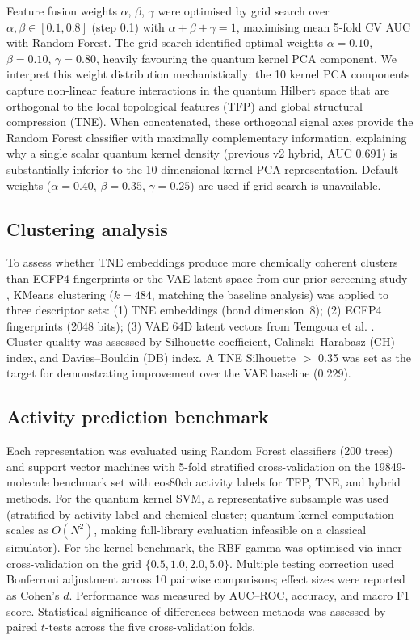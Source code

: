 \documentclass[11pt,a4paper]{article}
\begin{document}
Feature fusion weights $\alpha$, $\beta$, $\gamma$ were optimised by grid search over $\alpha, \beta \in [0.1, 0.8]$ (step 0.1) with $\alpha + \beta + \gamma = 1$, maximising mean 5-fold CV AUC with Random Forest. The grid search identified optimal weights $\alpha = 0.10$, $\beta = 0.10$, $\gamma = 0.80$, heavily favouring the quantum kernel PCA component. We interpret this weight distribution mechanistically: the 10 kernel PCA components capture non-linear feature interactions in the quantum Hilbert space that are orthogonal to the local topological features (TFP) and global structural compression (TNE). When concatenated, these orthogonal signal axes provide the Random Forest classifier with maximally complementary information, explaining why a single scalar quantum kernel density (previous v2 hybrid, AUC \num{0.691}) is substantially inferior to the 10-dimensional kernel PCA representation. Default weights ($\alpha = 0.40$, $\beta = 0.35$, $\gamma = 0.25$) are used if grid search is unavailable.

\subsection{Clustering analysis}

To assess whether TNE embeddings produce more chemically coherent clusters than ECFP4 fingerprints or the VAE latent space from our prior screening study \citep{temgoua2026antimalarial}, KMeans clustering ($k = 484$, matching the baseline analysis) was applied to three descriptor sets: (1) TNE embeddings (bond dimension~8); (2) ECFP4 fingerprints (\num{2048} bits); (3) VAE 64D latent vectors from Temgoua et al. \citep{temgoua2026antimalarial}. Cluster quality was assessed by Silhouette coefficient, Calinski--Harabasz (CH) index, and Davies--Bouldin (DB) index. A TNE Silhouette $>$ 0.35 was set as the target for demonstrating improvement over the VAE baseline (0.229).

\subsection{Activity prediction benchmark}

Each representation was evaluated using Random Forest classifiers (200 trees) and support vector machines with 5-fold stratified cross-validation on the \num{19849}-molecule benchmark set with eos80ch activity labels for TFP, TNE, and hybrid methods. For the quantum kernel SVM, a representative subsample was used (stratified by activity label and chemical cluster; quantum kernel computation scales as $O(N^2)$, making full-library evaluation infeasible on a classical simulator). For the kernel benchmark, the RBF gamma was optimised via inner cross-validation on the grid $\{0.5, 1.0, 2.0, 5.0\}$. Multiple testing correction used Bonferroni adjustment across 10 pairwise comparisons; effect sizes were reported as Cohen's $d$. Performance was measured by AUC--ROC, accuracy, and macro F1 score. Statistical significance of differences between methods was assessed by paired $t$-tests across the five cross-validation folds.
\end{document}
